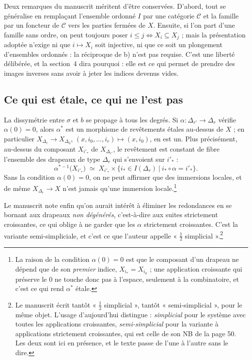 \documentclass[11pt,a4paper]{article}
\begin{document}
Deux remarques du manuscrit méritent d'être conservées. D'abord, tout se
généralise en remplaçant l'ensemble ordonné $I$ par une catégorie
$\mathcal{C}$ et la famille par un foncteur de $\mathcal{C}$ vers les parties
fermées de $X$. Ensuite, si l'on part d'une famille sans ordre, on peut toujours
poser $i \leq j \iff X_{i} \subseteq X_{j}$ ; mais la présentation adoptée
n'exige ni que $i \mapsto X_{i}$ soit injective, ni que ce soit un plongement
d'ensembles ordonnés : la réciproque de b) n'est pas requise. C'est une liberté
délibérée, et la section~4 dira pourquoi : elle est ce qui permet de prendre des
images inverses sans avoir à jeter les indices devenus vides.

\subsection*{Ce qui est étale, ce qui ne l'est pas}

La dissymétrie entre $\sigma$ et $b$ se propage à tous les degrés. Si
$\alpha \colon \Delta_{r'} \to \Delta_{r}$ vérifie $\alpha(0) = 0$, alors
$\alpha^{*}$ est un morphisme de revêtements étales au-dessus de $X$ ; en
particulier $X_{\Delta_{r}} \to X_{\Delta_{0}}$, $(x,i_{0},\ldots,i_{r}) \mapsto
(x,i_{0})$, en est un. Plus précisément, au-dessus du composant $X_{i'_{*}}$ de
$X_{\Delta_{r'}}$, le revêtement est constant de fibre l'ensemble des drapeaux
de type $\Delta_{r}$ qui s'envoient sur $i'_{*}$ :
\[
  \alpha^{*-1}\bigl(X_{i'_{*}}\bigr) \;\simeq\;
  X_{i'_{*}} \times \bigl\{ i_{*} \in I(\Delta_{r})
    \ \big|\ i_{*} \circ \alpha = i'_{*} \bigr\}.
\]
Sans la condition $\alpha(0) = 0$, on ne peut affirmer que des immersions
locales, et de même $X_{\Delta_{r}} \to X$ n'est jamais qu'une immersion
locale.\footnote{La raison de la condition $\alpha(0) = 0$ est que le composant
d'un drapeau ne dépend que de son \emph{premier} indice, $X_{i_{*}} = X_{i_{0}}$ ;
une application croissante qui préserve le $0$ ne touche donc pas à l'espace,
seulement à la combinatoire, et c'est ce qui rend $\alpha^{*}$ étale.}

Le manuscrit note enfin qu'on aurait intérêt à éliminer les redondances en se
bornant aux drapeaux \emph{non dégénérés}, c'est-à-dire aux suites strictement
croissantes, ce qui oblige à ne garder que les $\alpha$ strictement croissantes.
C'est la variante semi-simpliciale, et c'est ce que l'auteur appelle
« $\tfrac{1}{2}$ simplicial ».\footnote{Le manuscrit écrit tantôt
« $\tfrac{1}{2}$ simplicial », tantôt « semi-simplicial », pour le même objet.
L'usage d'aujourd'hui distingue : \emph{simplicial} pour le système avec toutes
les applications croissantes, \emph{semi-simplicial} pour la variante à
applications strictement croissantes, qui est celle de son NB de la page 50. Les
deux sont ici en présence, et le texte passe de l'une à l'autre sans le dire.}
\end{document}
